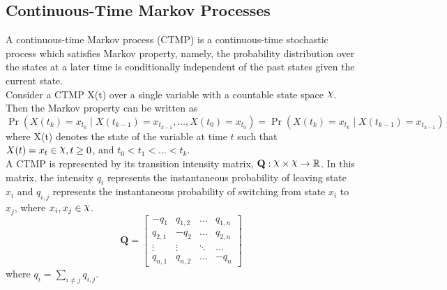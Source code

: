 \subsection{Continuous-Time Markov Processes}
A continuous-time Markov process (CTMP) is a continuous-time stochastic process which satisfies Markov property, namely, the probability distribution over the states at a later time is conditionally independent of the past states given the current state.\cite{Cohn2010a} \\
Consider a CTMP X(t) over a single variable with a countable state space $ \rchi $. Then the Markov property can be written as
\begin{equation}
\operatorname{Pr}\left(X(t_{k})=x_{t_{k}} \mid X(t_{k-1})=x_{t_{k-1}}, \ldots, X(t_{0})=x_{t_{0}}\right)=\operatorname{Pr}\left(X(t_{k})=x_{t_{k}} \mid X(t_{k-1})=x_{t_{k-1}}\right)
\end{equation}
where X(t) denotes the state of the variable at time $ t $ such that $ X(t)=x_t \in \rchi, t \geq 0$, and $ t_0<t_1<...<t_k $.\\
A CTMP is represented by its transition intensity matrix, $ \textbf{Q} : \rchi \times \rchi \rightarrow \mathbb{R}$. In this matrix, the intensity $ q_{i} $ represents the instantaneous probability of leaving state $ x_{i} $ and $ q_{i,j} $ represents the instantaneous probability of switching from state $ x_{i} $ to $ x_{j} $, where $ x_i, x_j \in \rchi $. 
\begin{equation}
\textbf{Q} = 
\begin{bmatrix}
-q_{1} & q_{1,2} &     {\hdots}  & q_{1,n} \\
q_{2,1} & -q_{2} &     {\hdots}  & q_{2,n}  \\
{\vdots}  &     {\vdots}  &     {\ddots}  & {\hdots}  \\
q_{n,1} &  q_{n,2} &  {\hdots} & -q_{n}
\end{bmatrix}
\label{eq:Q_matrix}
\end{equation}
where $ q_{i} = \sum_{i \neq j} q_{i,j}$.\cite{Nodelman1995}

